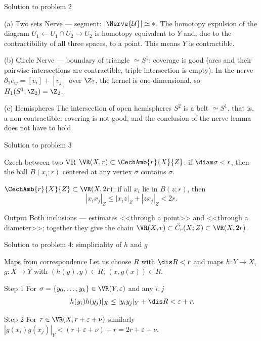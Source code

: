 \documentclass[aspectratio=169,11pt]{beamer}
\begin{document}
\begin{frame}{Solution to problem \textup{2}}
\begin{block}{\textup{(a)} Two sets}
Nerve --- segment\textup{:} $|\Nerve{\mathcal U}| \simeq *$. The homotopy expulsion of the diagram $U_1 \leftarrow U_1\cap U_2 \rightarrow U_2$ is homotopy equivalent to $Y$ and, due to the contractibility of all three spaces, to a point. This means $Y$ is contractible.
\end{block}
\begin{block}{\textup{(b)} Circle}
Nerve --- boundary of triangle $\simeq S^1$\textup{:} coverage is good \textup{(}arcs and their pairwise intersections are contractible, triple intersection is empty\textup{)}. In the nerve $\partial_1 e_{ij} = [v_i]+[v_j]$ over $\Z_2$, the kernel is one-dimensional, so $H_1(S^1;\Z_2) = \Z_2$.
\end{block}
\begin{block}{\textup{(c)} Hemispheres}
The intersection of open hemispheres $S^2$ is a belt $\simeq S^1$, that is, a non-contractible\textup{:} covering is not good, and the conclusion of the nerve lemma does not have to hold.
\end{block}
\end{frame}

\begin{frame}{Solution to problem \textup{3}}
\begin{block}{Czech between two VR}
$\VR(X,r) \subset \CechAmb{r}{X}{Z}$\textup{:} if $\diam\sigma < r$, then the ball $B(x_i;r)$ centered at any vertex $\sigma$ contains $\sigma$.
\end{block}
\begin{block}{}
$\CechAmb{r}{X}{Z} \subset \VR(X,2r)$\textup{:} if all $x_i$ lie in $B(z;r)$, then
\[
|x_i x_j|_Z \le |x_i z|_Z + |z x_j|_Z < 2r .
\]
\end{block}
\begin{block}{Output}
Both inclusions --- estimates <<through a point>> and <<through a diameter>>\textup{;} together they give the chain $\VR(X,r) \subset \check C_r(X;Z) \subset \VR(X,2r)$.
\end{block}
\end{frame}

\begin{frame}{Solution to problem \textup{4}: simpliciality of $h$ and $g$}
\begin{block}{Maps from correspondence}
Let us choose $R$ with $\dis R < r$ and maps $h\colon Y \to X$, $g\colon X \to Y$ with $(h(y),y) \in R$, $(x,g(x)) \in R$.
\end{block}
\begin{block}{Step \textup{1}}
For $\sigma = \{y_0,\dots,y_k\} \in \VR(Y,\varepsilon)$ and any $i,j$
\[
|h(y_i)h(y_j)|_X \le |y_i y_j|_Y + \dis R < \varepsilon + r .
\]
\end{block}
\begin{block}{Step \textup{2}}
For $\tau \in \VR(X, r+\varepsilon+\nu)$ similarly $|g(x_i)g(x_j)|_Y < (r+\varepsilon+\nu) + r = 2r+\varepsilon+\nu$.
\end{block}
\end{frame}
\end{document}
